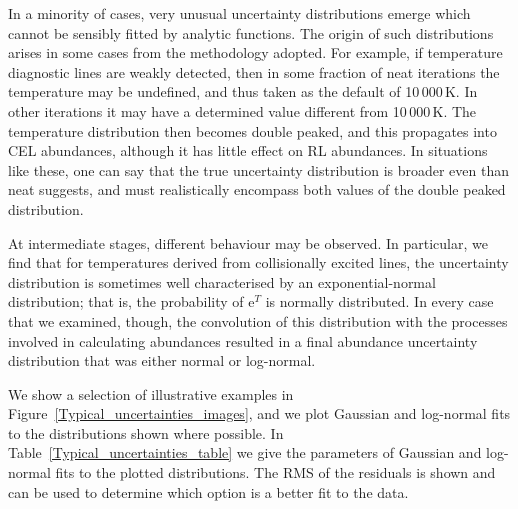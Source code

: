 \documentclass[useAMS,usenatbib]{mn2e}
\begin{document}
In a minority of cases, very unusual uncertainty distributions emerge which cannot be sensibly fitted by analytic functions.  The origin of such distributions arises in some cases from the methodology adopted.  For example, if temperature diagnostic lines are weakly detected, then in some fraction of {\sc neat} iterations the temperature may be undefined, and thus taken as the default of 10\,000\,K.  In other iterations it may have a determined value different from 10\,000\,K.  The temperature distribution then becomes double peaked, and this propagates into CEL abundances, although it has little effect on RL abundances.  In situations like these, one can say that the true uncertainty distribution is broader even than {\sc neat} suggests, and must realistically encompass both values of the double peaked distribution.

At intermediate stages, different behaviour may be observed.  In particular, we find that for temperatures derived from collisionally excited lines, the uncertainty distribution is sometimes well characterised by an exponential-normal distribution; that is, the probability of e$^T$ is normally distributed.  In every case that we examined, though, the convolution of this distribution with the processes involved in calculating abundances resulted in a final abundance uncertainty distribution that was either normal or log-normal.

We show a selection of illustrative examples in Figure~\ref{Typical_uncertainties_images}, and we plot Gaussian and log-normal fits to the distributions shown where possible.  In Table~\ref{Typical_uncertainties_table} we give the parameters of Gaussian and log-normal fits to the plotted distributions.  The RMS of the residuals is shown and can be used to determine which option is a better fit to the data.
\end{document}
